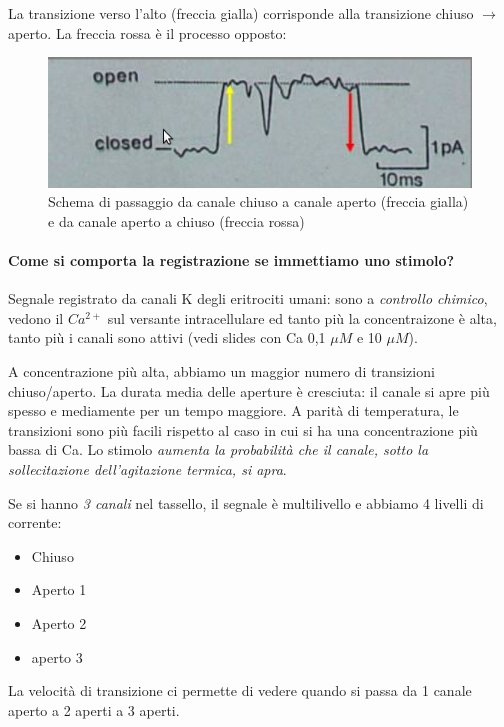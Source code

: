 \documentclass[a4paper,12pt]{article}
\newcommand{\freccia}{\ensuremath{\rightarrow}}
\begin{document}
La transizione verso l'alto (freccia gialla) corrisponde alla transizione chiuso \freccia aperto. La freccia rossa è il processo opposto:

\begin{figure}[H]
\centering
\includegraphics[scale=0.40]{immagine/can.jpg}
\caption{Schema di passaggio da canale chiuso a canale aperto (freccia gialla) e da canale aperto a chiuso (freccia rossa)}
\end{figure}


\paragraph{Come si comporta la registrazione se immettiamo uno stimolo?}

Segnale registrato da canali K degli eritrociti umani: sono a \emph{controllo chimico}, vedono il $Ca^{2+}$ sul versante intracellulare ed tanto più la concentraizone è alta, tanto più i canali sono attivi (vedi slides con Ca 0,1 $\mu M$ e 10 $\mu M$).

A concentrazione più alta, abbiamo un maggior numero di transizioni chiuso/aperto. La durata media delle aperture è cresciuta: il canale si apre più spesso e mediamente per un tempo maggiore. A parità di temperatura, le transizioni sono più facili rispetto al caso in cui si ha una concentrazione più bassa di Ca. Lo stimolo \emph{aumenta la probabilità che il canale, sotto la sollecitazione dell'agitazione termica, si apra}.

Se si hanno \emph{3 canali} nel tassello, il segnale è multilivello e abbiamo 4 livelli di corrente:
\begin{itemize}
\item{Chiuso}
\item{Aperto 1}
\item{Aperto 2}
\item{aperto 3}
\end{itemize}

La velocità di transizione ci permette di vedere quando si passa da 1 canale aperto a 2 aperti a 3 aperti.
\end{document}
